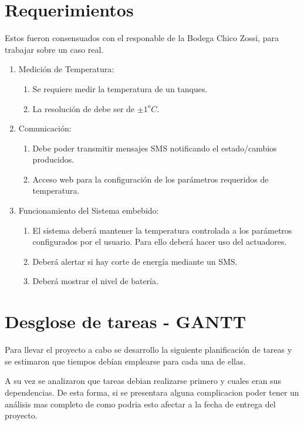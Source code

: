   \section{Requerimientos}

Estos fueron consensuados con el responable de la Bodega Chico Zossi, para trabajar sobre un caso real. 

\begin{enumerate}[label*=\arabic*.]
  \item Medición de Temperatura:
    \begin{enumerate}[label*=\arabic*.]
      \item  Se requiere medir la temperatura de un tanques.
      \item La resolución de debe ser de $\pm 1^oC$.
    \end{enumerate}
  \item Comunicación:
    \begin{enumerate}[label*=\arabic*.]
      \item Debe poder transmitir mensajes SMS notificando el estado/cambios producidos.
      \item Acceso web para la configuración de los parámetros requeridos de temperatura. 
    \end{enumerate}
  \item Funcionamiento del Sistema embebido:
    \begin{enumerate}[label*=\arabic*.]
      \item El sistema deberá mantener la temperatura controlada a los parámetros configurados por el usuario. Para ello deberá hacer uso del actuadores.
      \item Deberá alertar si hay corte de energía mediante un SMS.
      \item Deberá mostrar el nivel de batería.
  \end{enumerate}
\end{enumerate}


\section{Desglose de tareas - GANTT}
Para llevar el proyecto a cabo se desarrollo la siguiente planificación de tareas y se estimaron que tiempos debían emplearse para cada una de ellas.

A su vez se analizaron que tareas debian realizarse primero y cuales eran sus dependencias. De esta forma, si se presentara alguna complicacion poder tener un análisis mas completo de como podria esto afectar a la fecha de entrega del proyecto.

